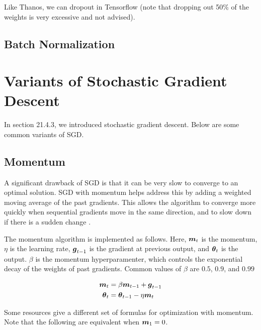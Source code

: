 \documentclass{article}
\begin{document}
\FloatBarrier

Like Thanos, we can dropout in Tensorflow (note that dropping out 50\% of the weights is very excessive and not advised)\cite{tensorflow2015-whitepaper}.



\FloatBarrier

\subsection{Batch Normalization}

\section{Variants of Stochastic Gradient Descent} %

In section 21.4.3, we introduced stochastic gradient descent. Below are some common variants of SGD.

\subsection{Momentum} %

A significant drawback of SGD is that it can be very slow to converge to an optimal solution. SGD with momentum helps address this by adding a weighted moving average of the past gradients. This allows the algorithm to converge more quickly when sequential gradients move in the same direction, and to slow down if there is a sudden change \cite{pml1book}. 

The momentum algorithm is implemented as follows. Here, \(\vb*{m}_t\) is the momentum, \(\eta\) is the learning rate, \(\vb*{g}_{t-1}\) is the gradient at previous output, and \(\vb*{\theta}_t\) is the output. \(\beta\) is the momentum hyperparamenter, which controls the exponential decay of the weights of past gradients. Common values of \(\beta\) are \(0.5\), \(0.9\), and \(0.99\) \cite{pml1book}



\begin{align*}
    \vb*{m}_t &= \beta \vb*{m}_{t-1} + \vb*{g}_{t-1} \\
    \vb*{\theta}_t &= \vb*{\theta}_{t-1} - \eta \vb*{m}_t
\end{align*}


Some resources give a different set of formulas for optimization with momentum. Note that the following are equivalent when \(\vb*{m}_1 = 0\).
\end{document}
